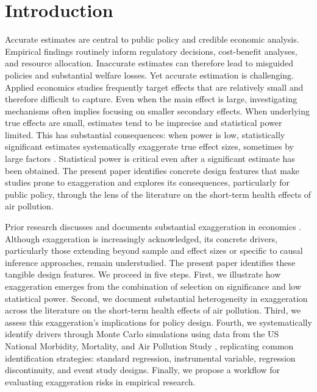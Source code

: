 \documentclass[12pt]{article}
\begin{document}
\onehalfspacing




	\section{Introduction}
	
		Accurate estimates are central to public policy and credible economic analysis. Empirical findings routinely inform regulatory decisions, cost-benefit analyses, and resource allocation. Inaccurate estimates can therefore lead to misguided policies and substantial welfare losses. Yet accurate estimation is challenging. Applied economics studies frequently target effects that are relatively small and therefore difficult to capture. Even when the main effect is large, investigating mechanisms often implies focusing on smaller secondary effects. When underlying true effects are small, estimates tend to be imprecise and statistical power limited. This has substantial consequences: when power is low, statistically significant estimates systematically exaggerate true effect sizes, sometimes by large factors \citep{gelman_type_2000, ioannidis_why_2008, gelman_beyond_2014}. Statistical power is critical even after a significant estimate has been obtained. The present paper identifies concrete design features that make studies prone to exaggeration and explores its consequences, particularly for public policy, through the lens of the literature on the short-term health effects of air pollution.
		
		Prior research discusses and documents substantial exaggeration in economics \citep{ioannidis_power_2017, ferraro_feature_2020, young_consistency_2022}. Although exaggeration is increasingly acknowledged, its concrete drivers, particularly those extending beyond sample and effect sizes or specific to causal inference approaches, remain understudied. The present paper identifies these tangible design features. We proceed in five steps. First, we illustrate how exaggeration emerges from the combination of selection on significance and low statistical power. Second, we document substantial heterogeneity in exaggeration across the literature on the short-term health effects of air pollution. Third, we assess this exaggeration's implications for policy design. Fourth, we systematically identify drivers through Monte Carlo simulations using data from the US National Morbidity, Mortality, and Air Pollution Study \citep{samet_national_2000}, replicating common identification strategies: standard regression, instrumental variable, regression discontinuity, and event study designs. Finally, we propose a workflow for evaluating exaggeration risks in empirical research.
				
\end{document}
